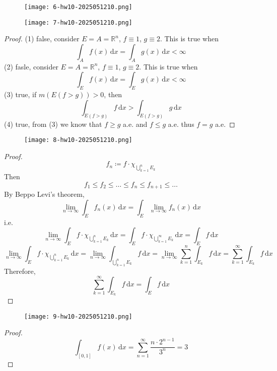 \begin{exercise}
\begin{figure}[H]
\centering
\texttt{[image: 6-hw10-2025051210.png]}
\label{}
\end{figure}
\begin{figure}[H]
\centering
\texttt{[image: 7-hw10-2025051210.png]}
\label{}
\end{figure}
\end{exercise}
\begin{proof}
(1) false, consider $E=A=\mathbb{R}^{n}$, $f\equiv1$, $g\equiv2$. This is true when
\[
\int_{A}^{} f(x) \, \mathrm{d}x =\int_{A}^{} g(x) \, \mathrm{d}x <\infty
\]
(2) fasle, consider $E=A=\mathbb{R}^{n}$, $f\equiv1$, $g\equiv2$. This is true when
\[
\int_{E}^{} f(x) \, \mathrm{d}x =\int_{E}^{} g(x) \, \mathrm{d}x <\infty
\]
(3) true, if $m(E(f>g))>0$, then
\[
\int_{E(f>g)}^{} f \, \mathrm{d}x >\int_{E(f>g)}^{} g \, \mathrm{d}x 
\]
(4) true, from (3) we know that $f\geq g$ a.e. and $f\leq g$ a.e. thus $f=g$ a.e.
\end{proof}

\begin{exercise}
\begin{figure}[H]
\centering
\texttt{[image: 8-hw10-2025051210.png]}
\label{}
\end{figure}
\end{exercise}
\begin{proof}
\[
f_n\coloneqq f\cdot \chi_{\bigcup_{k=1}^{n} E_k}
\]
Then
\[
f_1\leq f_2\leq \dots\leq f_n\leq f_{n+1}\leq \dots
\]
By Beppo Levi's theorem,
\[
\lim_{ n \to \infty } \int_{E}^{} f_n(x) \, \mathrm{d}x=\int_{E}^{} \lim_{ n \to \infty } f_n(x) \, \mathrm{d}x
\]
i.e.
\[
\lim_{ n \to \infty } \int_{E}^{} f\cdot \chi_{\bigcup_{k=1}^{n} E_k} \, \mathrm{d}x =\int_{E}^{} f\cdot \chi_{\bigcup_{k=1}^{\infty} E_k} \, \mathrm{d}x =\int_{E}^{} f \, \mathrm{d}x 
\]
\[
\lim_{ n \to \infty } \int_{E}^{} f\cdot \chi_{\bigcup_{k=1}^{n} E_k} \, \mathrm{d}x =\lim_{ n \to \infty } \int_{\bigcup_{k=1}^{n} E_k}^{} f \, \mathrm{d}x =\lim_{ n \to \infty } \sum_{k=1}^{n} \int_{E_k}^{} f \, \mathrm{d}x =\sum_{k=1}^{\infty} \int_{E_k}^{} f \, \mathrm{d}x
\]
Therefore,
\[
\sum_{k=1}^{\infty} \int_{E_k}^{} f \, \mathrm{d}x =\int_{E}^{} f \, \mathrm{d}x
\]
\end{proof}

\begin{exercise}
\begin{figure}[H]
\centering
\texttt{[image: 9-hw10-2025051210.png]}
\label{}
\end{figure}
\end{exercise}
\begin{proof}
\[
\int_{[0,1]}^{} f(x) \, \mathrm{d}x =\sum_{n=1}^{\infty} \frac{n \cdot2^{n-1}}{3^{n}}=3
\]
\end{proof}
